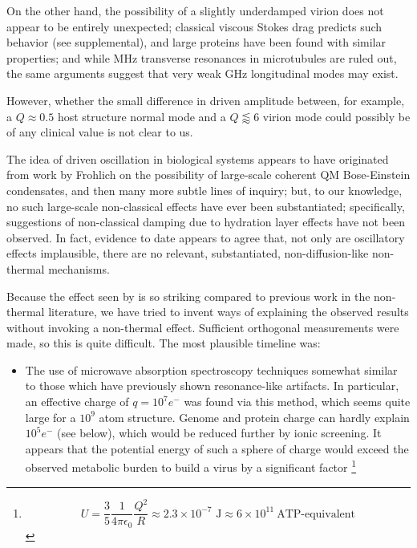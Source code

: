 \documentclass[paper.tex]{subfiles}
\begin{document}
\begin{multicols}{1}
On the other hand, the possibility of a slightly underdamped virion does not appear to be entirely unexpected; classical viscous Stokes drag predicts such behavior\cite{nature1986} (see supplemental), and large proteins have been found with similar properties\cite{Microwave1994}; and while MHz transverse resonances in microtubules are ruled out\cite{Viscous2000}, the same arguments suggest that very weak GHz longitudinal modes may exist.

However, whether the small difference in driven amplitude between, for example, a $Q\approx0.5$ host structure normal mode and a $Q\lessapprox6$ virion mode could possibly be of any clinical value is not clear to us.

%

The idea of driven oscillation in biological systems appears to have originated from work by Frohlich\cite{Longrange1968}\cite{Evidence1983}\cite{Biological1980}\cite{Coherence1983} on the possibility of large-scale coherent QM Bose-Einstein condensates, and then many more subtle lines of inquiry\cite{Mechanisms1992}\cite{mechanisms1981}; but, to our knowledge, no such large-scale non-classical effects have ever been substantiated; specifically, suggestions of non-classical damping due to hydration layer effects have not been observed. In fact, evidence to date\cite{Exposure2009}\cite{ICNIRP2020}\cite{C95} appears to agree that, not only are oscillatory effects implausible, there are no relevant, substantiated, non-diffusion-like non-thermal mechanisms. 

Because the effect seen by\cite{Efficient2015} is so striking compared to previous work in the non-thermal literature, we have tried to invent ways of explaining the observed results without invoking a non-thermal effect. Sufficient orthogonal measurements were made, so this is quite difficult. The most plausible timeline was:
\begin{itemize}
	\item The use of microwave absorption spectroscopy techniques somewhat similar to those which have previously shown resonance-like artifacts\cite{Resonances1987}. In particular, an effective charge of $q=10^7 e^-$ was found via this method, which seems quite large for a $10^9$ atom structure. Genome and protein charge can hardly explain $10^5 e^-$ (see below), which would be reduced further by ionic screening. It appears that the potential energy of such a sphere of charge would exceed the observed metabolic burden to build a virus by a significant factor \footnote{
		$$ U = \frac{3}{5}  \frac{1}{4 \pi \epsilon_0} \frac{Q^2}{R} \approx 2.3
		\times10^{-7} \text{ J} \approx 6 \times 10^{11}\  \text{ATP-equivalent} $$
		
}
\end{itemize}
\end{multicols}
\end{document}
